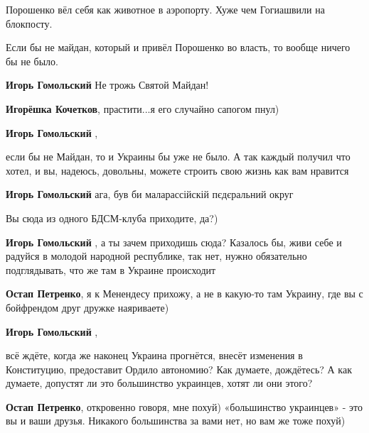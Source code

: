  
 
 
 
 
\zzSecCmt

\begin{itemize} %
Порошенко вёл себя как животное в аэропорту. Хуже чем Гогиашвили на блокпосту.

Если бы не майдан, который и привёл Порошенко во власть, то вообще ничего бы не было.

\begin{itemize} %
\textbf{Игорь Гомольский} Не трожь Святой Майдан!

\textbf{Игорёшка Кочетков}, прастити...я его случайно сапогом пнул)

\textbf{Игорь Гомольский} , 

если бы не Майдан, то и Украины бы уже не было. А так каждый получил что хотел,
и вы, надеюсь, довольны, можете строить свою жизнь как вам нравится


\textbf{Игорь Гомольский} ага, був би маларассійскій пєдєральний округ

Вы сюда из одного БДСМ-клуба приходите, да?)

\textbf{Игорь Гомольский} , а ты зачем приходишь сюда? Казалось бы, живи себе и радуйся в молодой народной республике, так нет, нужно обязательно подглядывать, что же там в Украине происходит

\textbf{Остап Петренко}, я к Менендесу прихожу, а не в какую-то там Украину, где вы с бойфрендом друг дружке наяриваете)

\textbf{Игорь Гомольский} , 

всё ждёте, когда же наконец Украина прогнётся, внесёт изменения в Конституцию,
предоставит Ордило автономию? Как думаете, дождётесь? А как думаете, допустят
ли это большинство украинцев, хотят ли они этого?


\textbf{Остап Петренко}, откровенно говоря, мне похуй) «большинство украинцев» - это вы и ваши друзья. Никакого большинства за вами нет, но вам же тоже похуй)


\end{itemize}
\end{itemize}
